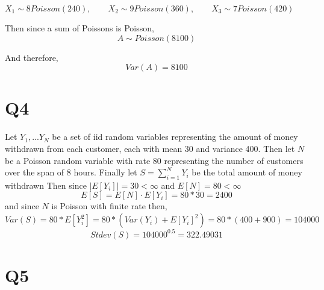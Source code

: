 \documentclass{article}
\begin{document}
$X_1 \sim 8 Poisson(240), \qquad X_2 \sim 9Poisson(360), \qquad X_3 \sim 7Poisson(420)$

Then since a sum of Poissons is Poisson,
$$
A \sim Poisson(8100)
$$

And therefore,
$$
Var(A) = 8100
$$


\section*{Q4}
Let $Y_1, ... Y_N$ be a set of iid random variables representing the amount of money withdrawn from each customer, each with mean 30 and variance 400. Then let $N$ be a Poisson random variable with rate 80 representing the number of customers over the span of 8 hours. 
Finally let $S = \sum_{i = 1} ^ N Y_i$ be the total amount of money withdrawn
Then since $|E[Y_i]| = 30 < \infty$ and $E[N] = 80 < \infty$ 
$$
E[S] = E[N] \cdot E[Y_i] = 80 * 30 = 2400
$$
and since $N$ is Poisson with finite rate then,
$$
Var(S) = 80 * E[Y_i^2] = 80 * ( Var(Y_i) + E[Y_i]^2) = 80*(400 + 900) = 104000
$$
$$
Stdev(S) = 104000^{0.5} = 322.49031
$$


\section*{Q5}
\end{document}
